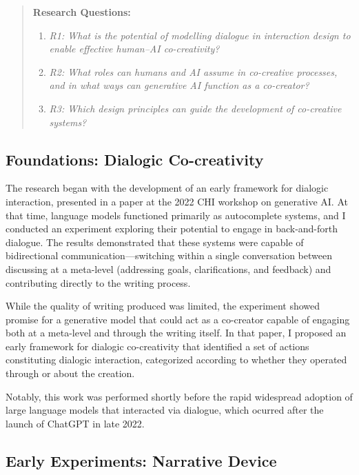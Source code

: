 \begin{quote}
\textbf{Research Questions:}

\begin{enumerate}
    \item \textit{R1: What is the potential of modelling dialogue in interaction design to enable effective human–AI co-creativity?}
    \item \textit{R2: What roles can humans and AI assume in co-creative processes, and in what ways can generative AI function as a co-creator?}
    \item \textit{R3: Which design principles can guide the development of co-creative systems?}
\end{enumerate}

\end{quote}

\subsection{Foundations: Dialogic Co-creativity}

The research began with the development of an early framework for dialogic interaction, presented in a paper at the 2022 CHI workshop on generative AI. At that time, language models functioned primarily as autocomplete systems, and I conducted an experiment exploring their potential to engage in back-and-forth dialogue. The results demonstrated that these systems were capable of bidirectional communication—switching within a single conversation between discussing at a meta-level (addressing goals, clarifications, and feedback) and contributing directly to the writing process.

While the quality of writing produced was limited, the experiment showed promise for a generative model that could act as a co-creator capable of engaging both at a meta-level and through the writing itself. In that paper, I proposed an early framework for dialogic co-creativity that identified a set of actions constituting dialogic interaction, categorized according to whether they operated through or about the creation.

Notably, this work was performed shortly before the rapid widespread adoption of large language models that interacted via dialogue,  which ocurred after the launch of ChatGPT in late 2022.

\subsection{Early Experiments: Narrative Device}

